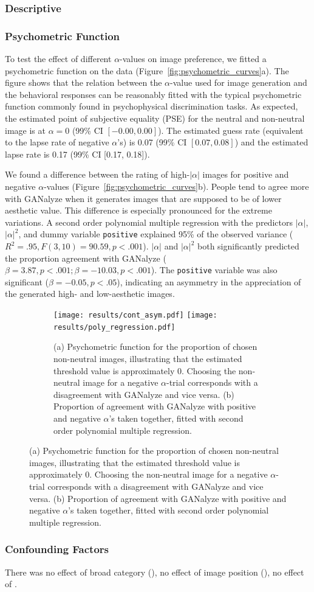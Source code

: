 \documentclass[../main.tex]{subfiles}
\begin{document}
	\subsubsection{Descriptive}
	
	
	
	\subsubsection{Psychometric Function}
	To test the effect of different $\alpha$-values on image preference, we fitted a psychometric function on the data (Figure~\ref{fig:psychometric_curves}a). The figure shows that the relation between the $\alpha$-value used for image generation and the behavioral responses can be reasonably fitted with the typical psychometric function commonly found in psychophysical discrimination tasks. As expected, the estimated point of subjective equality (PSE) for the neutral and non-neutral image is at $\alpha = 0$ (99\% CI $[-0.00, 0.00]$). The estimated guess rate (equivalent to the lapse rate of negative $\alpha$'s) is 0.07 (99\% CI $[0.07, 0.08]$) and the estimated lapse rate is 0.17 (99\% CI [0.17, 0.18]).
	
	We found a difference between the rating of high-$|\alpha|$ images for positive and negative $\alpha$-values (Figure~\ref{fig:psychometric_curves}b). People tend to agree more with GANalyze when it generates images that are supposed to be of lower aesthetic value. This difference is especially pronounced for the extreme variations. A second order polynomial multiple regression with the predictors $|\alpha|$, $|\alpha|^2$, and dummy variable \texttt{positive} explained 95\% of the observed variance ($R^2=.95, F(3,10)=90.59, p<.001$). $|\alpha|$ and $|\alpha|^2$ both significantly predicted the proportion agreement with GANalyze ($\beta=3.87, p<.001; \beta=-10.03, p<.001$). The \texttt{positive} variable was also significant ($\beta=-0.05, p<.05$), indicating an asymmetry in the appreciation of the generated high- and low-aesthetic images.  

	\begin{figure}[h!]
		\caption{Behavioral Results from the Image Rating Task}
		\label{fig:psychometric_curves}
		\centering
		\begin{subfigure}{\textwidth}
			{\centering
			\texttt{[image: results/cont\_asym.pdf]}
			\hfill
			\texttt{[image: results/poly\_regression.pdf]}}
			\caption{\normalfont\doublespacing (a) Psychometric function for the proportion of chosen non-neutral images, illustrating that the estimated threshold value is approximately 0. Choosing the non-neutral image for a negative $\alpha$-trial corresponds with a disagreement with GANalyze and vice versa. (b) Proportion of agreement with GANalyze with positive and negative $\alpha$'s taken together, fitted with second order polynomial multiple regression.}
		\end{subfigure} \hfill
	\end{figure}

	\subsubsection{Confounding Factors}
	There was no effect of broad category (), no effect of image position (), no effect of  .
\end{document}
